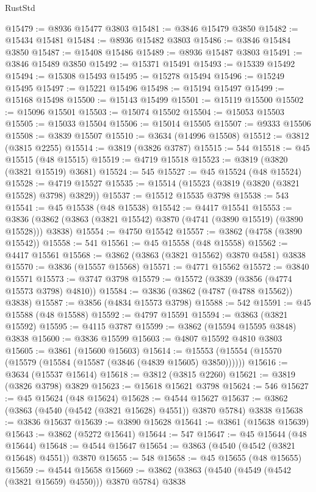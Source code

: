 \begin{lexlean}{RustStd}
\begin{coremodule}
@15479 := @8936 @15477 @3803
@15481 := @3846 @15479 @3850
@15482 := @15434 @15481
@15484 := @8936 @15482 @3803
@15486 := @3846 @15484 @3850
@15487 := @15408 @15486
@15489 := @8936 @15487 @3803
@15491 := @3846 @15489 @3850
@15492 := @15371 @15491
@15493 := @15339 @15492
@15494 := @15308 @15493
@15495 := @15278 @15494
@15496 := @15249 @15495
@15497 := @15221 @15496
@15498 := @15194 @15497
@15499 := @15168 @15498
@15500 := @15143 @15499
@15501 := @15119 @15500
@15502 := @15096 @15501
@15503 := @15074 @15502
@15504 := @15053 @15503
@15505 := @15033 @15504
@15506 := @15014 @15505
@15507 := @9333 @15506
@15508 := @3839 @15507
@15510 := @3634 (@14996 @15508)
@15512 := @3812 (@3815 @2255)
@15514 := @3819 (@3826 @3787)
@15515 := 544
@15518 := @45 @15515 (@48 @15515)
@15519 := @4719 @15518
@15523 := @3819 (@3820 (@3821 @15519) @3681)
@15524 := 545
@15527 := @45 @15524 (@48 @15524)
@15528 := @4719 @15527
@15535 := @15514 (@15523 (@3819 (@3820 (@3821 @15528) @3798) @3829))
@15537 := @15512 @15535 @3798
@15538 := 543
@15541 := @45 @15538 (@48 @15538)
@15542 := @4417 @15541
@15553 := @3836 (@3862 (@3863 (@3821 @15542) @3870 (@4741 (@3890 @15519) (@3890 @15528))) @3838)
@15554 := @4750 @15542
@15557 := @3862 (@4758 (@3890 @15542))
@15558 := 541
@15561 := @45 @15558 (@48 @15558)
@15562 := @4417 @15561
@15568 := @3862 (@3863 (@3821 @15562) @3870 @4581) @3838
@15570 := @3836 (@15557 @15568)
@15571 := @4771 @15562
@15572 := @3840 @15571
@15573 := @3747 @3798
@15579 := @15572 (@3839 (@3856 (@4774 @15573 @3798) @4810))
@15584 := @3836 (@3862 (@4787 (@4788 @15562)) @3838)
@15587 := @3856 (@4834 @15573 @3798)
@15588 := 542
@15591 := @45 @15588 (@48 @15588)
@15592 := @4797 @15591
@15594 := @3863 (@3821 @15592)
@15595 := @4115 @3787
@15599 := @3862 (@15594 @15595 @3848) @3838
@15600 := @3836 @15599
@15603 := @4807 @15592 @4810 @3803
@15605 := @3861 (@15600 @15603)
@15614 := @15553 (@15554 (@15570 (@15579 (@15584 (@15587 (@3846 (@4839 @15605) @3850))))))
@15616 := @3634 (@15537 @15614)
@15618 := @3812 (@3815 @2260)
@15621 := @3819 (@3826 @3798) @3829
@15623 := @15618 @15621 @3798
@15624 := 546
@15627 := @45 @15624 (@48 @15624)
@15628 := @4544 @15627
@15637 := @3862 (@3863 (@4540 (@4542 (@3821 @15628) @4551)) @3870 @5784) @3838
@15638 := @3836 @15637
@15639 := @3890 @15628
@15641 := @3861 (@15638 @15639)
@15643 := @3862 (@5272 @15641)
@15644 := 547
@15647 := @45 @15644 (@48 @15644)
@15648 := @4544 @15647
@15654 := @3863 (@4540 (@4542 (@3821 @15648) @4551)) @3870
@15655 := 548
@15658 := @45 @15655 (@48 @15655)
@15659 := @4544 @15658
@15669 := @3862 (@3863 (@4540 (@4549 (@4542 (@3821 @15659) @4550))) @3870 @5784) @3838

\end{coremodule}
\end{lexlean}
